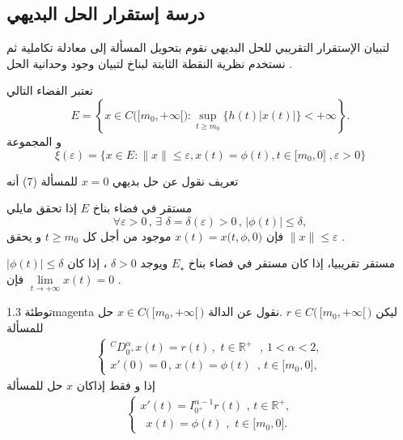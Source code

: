 \documentclass[dvipsnames,mathserif]{beamer}
\begin{document}
\subsection{درسة إستقرار الحل البديهي}
\begin{frame}
\begin{tcolorbox}[enhanced,colback=yellow!10!white,boxrule=0pt,frame hidden,
borderline north={1mm}{-2mm}{red},
borderline south={1mm}{-2mm}{blue},
borderline west={1mm}{-2mm}{green},
borderline east={1mm}{-2mm}{yellow}]
{\LARGE{}}
  لتبيان الإستقرار التقريبي للحل البديهي نقوم بتحويل المسألة 
  إلى معادلة تكاملية ثم نستخدم نظرية النقطة الثابتة لبناخ لتبيان وجود وحدانية الحل .

نعتبر  الفضاء التالي 
$$E = \left\{ {x \in C\bigg( {\big[{m_0}, + \infty \big[} \bigg):\mathop {\sup }\limits_{t \ge {m_0}} \big\{ h(t)\left| {x(t)} \right|\big\}  < +\infty } \right\}.$$
و المجموعة 
$$\xi (\varepsilon ) = \bigg\{ {x \in E:\big\| x \big\| \le \varepsilon ,x(t) = \phi (t),t \in \big[{m_0},0\big]}\;,\varepsilon  > 0 \bigg\}$$
\end{tcolorbox}
\end{frame}
\begin{frame}
\begin{mybox}[colbacktitle = green]{ تعريف}
 {\LARGE{}}
نقول عن حل بديهي 
$x=0$
للمسألة
(7)
أنه

{\large{}}
 مستقر في فضاء بناخ 
$E$
إذا تحقق مايلي 
$$\forall \varepsilon  > 0\,,\,\exists \,\,\delta  = \delta (\varepsilon ) > 0\,,\,\left| {\phi (t)} \right| \le \delta ,$$
فإن
$x(t)=x\big(t,\phi,0\big)$
موجود من أجل كل 
$t \ge {m_0}$
و يحقق 
$\big\| x \big\| \le \varepsilon$
.

{\large{}}
مستقر تقريبيا، إذا كان مستقر في فضاء بناخ 
$E_{\star}$
ويوجد 
$\delta  > 0$
، إذا كان
$\left| {\phi (t)} \right| \le \delta $
فإن 
$\mathop {\lim }\limits_{t \to  + \infty } x(t) = 0$
.
\end{mybox}
\end{frame}
\begin{frame}
\begin{box3}{توطئة 1.3}{magenta}
\label{tw3}
 {\LARGE{}}
ليكن 
$r \in C\big( \,{[{m_0}, + \infty [}\,\big)$
.نقول عن الدالة 
$x \in C\big( \,{[{m_0}, + \infty [}\, \big)$
حل للمسألة 
\begin{align}
\begin{cases}
{}^{C}D_{{0^{+}}}^\alpha x(t) = r(t)\,,\,\,t \in {\mathbb{R}^{+}}\,\,\,\,, \,1 < \alpha  < 2,\\
x'(0) = 0\,,\,x(t) = \phi (t)\,\,\,,\,t \in \big[{m_0},0\big],
\end{cases}
\end{align}
إذا و فقط إذاكان
$x$ 
حل للمسألة 
\begin{align}
\begin{cases}
x'(t) = I_{{0^ + }}^{\alpha  - 1}r(t)\,\,,\,t \in {\mathbb{R}^{+}},\\
\,\,\,x(t) = \phi (t)\,\,,\,\,t \in \big[{m_0},0\big].
\end{cases}
\end{align}
\end{box3}
\end{frame}
\end{document}
